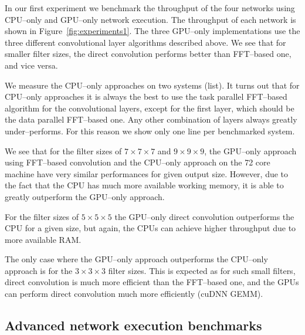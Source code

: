 \documentclass[conference]{IEEEtran}
\begin{document}
  In our first experiment we benchmark the throughput of the four
  networks using CPU--only and GPU--only network execution.  The
  throughput of each network is shown in
  Figure~\ref{fig:experiments1}.  The three GPU--only implementations
  use the three different convolutional layer algorithms described
  above.  We see that for smaller filter sizes, the direct convolution
  performs better than FFT--based one, and vice versa.

  We measure the CPU--only approaches on two systems (list).  It turns
  out that for CPU--only approaches it is always the best to use the
  task parallel FFT--based algorithm for the convolutional layers,
  except for the first layer, which should be the data parallel
  FFT--based one.  Any other combination of layers always greatly
  under--performs.  For this reason we show only one line per
  benchmarked system.

  We see that for the filter sizes of $7 \times 7 \times 7$ and $9
  \times 9 \times 9$, the GPU--only approach using FFT--based
  convolution and the CPU--only approach on the 72 core machine have
  very similar performances for given output size.  However, due to
  the fact that the CPU has much more available working memory, it is
  able to greatly outperform the GPU--only approach.

  For the filter sizes of $5 \times 5 \times 5$ the GPU--only direct
  convolution outperforms the CPU for a given size, but again, the
  CPUs can achieve higher throughput due to more available RAM.

  The only case where the GPU--only approach outperforms the CPU--only
  approach is for the $3 \times 3 \times 3$ filter sizes.  This is
  expected as for such small filters, direct convolution is much more
  efficient than the FFT--based one, and the GPUs can perform direct
  convolution much more efficiently (cuDNN GEMM).


\subsection{Advanced network execution benchmarks}
\end{document}
